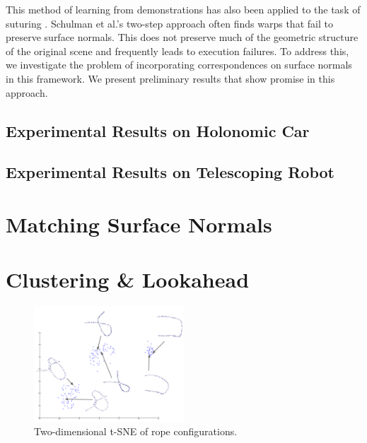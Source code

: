 \documentclass{article}
\begin{document}
This method of learning from demonstrations has also been applied to the task of suturing \cite{Schulmanetal_IROS2013}. Schulman et al.'s two-step approach often finds warps that fail to preserve surface normals. This does not preserve much of the geometric structure of the original scene and frequently leads to execution failures. To address this, we investigate the problem of incorporating correspondences on surface normals in this framework. We present preliminary results that show promise in this approach.





\subsection{Experimental Results on Holonomic Car}



\subsection{Experimental Results on Telescoping Robot}



\section{Matching Surface Normals}


\section{Clustering \& Lookahead}

\begin{figure}
\centering
\includegraphics[width=0.5\textwidth]{tsne_clusters}
\caption{Two-dimensional t-SNE of rope configurations.}
\label{fig:tsne_clusters}
\end{figure}
\end{document}
